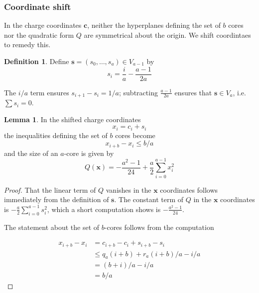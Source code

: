 \documentclass{amsart}[12pt]
\theoremstyle{definition}
\newtheorem{lemma}[dummy]{Lemma}
\newtheorem{definition}[dummy]{Definition}
\newcommand{\DP}{\mathcal{DP}}
\begin{document}








\subsubsection{Coordinate shift}
In the charge coordinates $\mathbf{c}$, neither the hyperplanes defining the set of $b$ cores nor the quadratic form $Q$ are symmetrical about the origin.  We shift coordintaes to remedy this.
\begin{definition}
Define $\mathbf{s}=(s_0,\dots, s_a)\in V_{a-1}$ by
$$s_i=\frac{i}{a}-\frac{a-1}{2a}$$
\end{definition}

The $i/a$ term ensures $s_{i+1}-s_i=1/a$; subtracting $\frac{a-1}{2a}$ ensures that  $\mathbf{s}\in V_a$, i.e. $\sum s_i=0$.
 
\begin{lemma}
In the shifted charge coordinates
$$x_i=c_i+s_i$$
the inequalities defining the set of $b$ cores become
$$x_{i+b}-x_{i}\leq b/a$$
and the size of an $a$-core is given by
$$Q(\mathbf{x})=-\frac{a^2-1}{24}+\frac{a}{2}\sum_{i=0}^{a-1} x_i^2$$
\end{lemma}

\begin{proof}
That the linear term of $Q$ vanishes in the $\mathbf{x}$ coordinates follows immediately from the definition of $\mathbf{s}$.  The constant term of $Q$ in the $\mathbf{x}$ coordinates is $-\frac{a}{2}\sum_{i=0}^{a-1} s_i^2$, which a short computation shows is $-\frac{a^2-1}{24}$.

The statement about the set of $b$-cores follows from the computation

\begin{align*}
x_{i+b}-x_{i}&=c_{i+b}-c_i+s_{i+b}-s_i \\
&\leq  q_a(i+b)+r_a(i+b)/a-i/a \\
&=(b+i)/a-i/a \\
&=b/a
\end{align*}
\end{proof}
\end{document}
